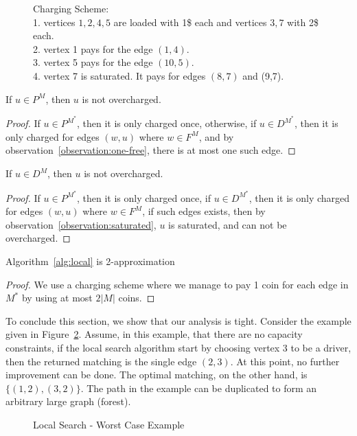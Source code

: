 \begin{figure}
\centering

\caption[]{
\label{fig:charging}
Charging Scheme:																	\\
1. vertices $1,2,4,5$ are loaded with 1\$ each and vertices $3,7$ with 2\$ each.	\\
2. vertex 1 pays for the edge $(1,4)$.												\\
3. vertex 5 pays for the edge $(10,5)$.												\\
4. vertex 7 is saturated. It pays for edges $(8,7)$ and (9,7). 
}
\end{figure}

\begin{observation}
\label{observation:p-not-charged}
If $u \in P^M$, then $u$ is not overcharged.
\end{observation}

\begin{proof}
If $u \in P^{M^*}$, then it is only charged once, otherwise, 
if $u \in D^{M^*}$, then it is only charged for edges $(w, u)$ where $w \in F^M$,
and by observation~\ref{observation:one-free}, there is at most one such edge. 
\end{proof}

\begin{observation}
\label{observation:d-not-charged}
If $u \in D^M$, then $u$ is not overcharged.
\end{observation}

\begin{proof}
If $u \in P^{M^*}$, then it is only charged once, 
if $u \in D^{M^*}$, then it is only charged for edges $(w, u)$ where $w \in F^M$,
if such edges exists, then by observation~\ref{observation:saturated}, $u$ is saturated, 
and can not be overcharged.
\end{proof}

\begin{theorem}
Algorithm~\ref{alg:local} is 2-approximation
\end{theorem}

\begin{proof}
We use a charging scheme where we manage to pay 1 coin for each edge in $M^*$
by using at most $2|M|$ coins.
\end{proof}


To conclude this section, we show that our analysis is tight.
Consider the example given in Figure~\ref{fig:localtight}.
Assume, in this example, that there are no capacity constraints,
if the local search algorithm start by choosing vertex $3$ to be a driver, 
then the returned matching is the single edge $(2,3)$.
At this point, no further improvement can be done.
The optimal matching, on the other hand, is $\{(1, 2), (3, 2)\}$. 
The path in the example can be duplicated to form an arbitrary large graph (forest).

\begin{figure} 

\caption{
\label{fig:localtight}
Local Search - Worst Case Example
}
\end{figure}